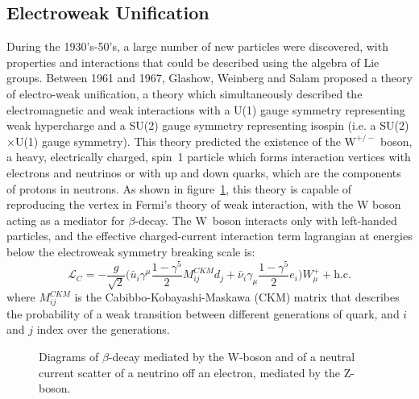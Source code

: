 \documentclass[/main.tex]{subfiles}
\begin{document}
\subsection{Electroweak Unification}
During the 1930's-50's, a large number of new particles were discovered, with properties and interactions that could be described using the algebra of Lie groups.
Between 1961 and 1967, Glashow, Weinberg and Salam proposed a theory of electro-weak unification, a theory which simultaneously described the electromagnetic and weak interactions with a U(1) gauge symmetry representing weak hypercharge and a SU(2) gauge symmetry representing isospin (i.e. a SU(2)$\times$U(1) gauge symmetry)\cite{Glashow1962, Weinberg1967, Salam1968}.
This theory predicted the existence of the $\mathrm{W}^{+/-}$ boson, a heavy, electrically charged, spin~1 particle which forms interaction vertices with electrons and neutrinos or with up and down quarks, which are the components of protons in neutrons.
As shown in figure~\ref{fig:betadecayW}, this theory is capable of reproducing the vertex in Fermi's theory of weak interaction, with the W boson acting as a mediator for $\beta$-decay.
The W~boson interacts only with left-handed particles, and the effective charged-current interaction term lagrangian at energies below the electroweak symmetry breaking scale is:
\begin{equation}
  \mathcal{L}_C=-\frac{g}{\sqrt{2}}\big(\bar u_i \gamma^\mu \frac{1-\gamma^5}{2} M^{CKM}_{ij}d_j + \bar \nu_i \gamma_\mu \frac{1-\gamma^5}{2} e_i\big)W^+_\mu + \mathrm{h.c.}  
\end{equation}
where $M^{CKM}_{ij}$ is the Cabibbo-Kobayashi-Maskawa (CKM) matrix that describes the probability of a weak transition between different generations of quark, and $i$ and $j$ index over the generations.
\begin{figure}[t]
  \centering
  \caption[$\beta$-decay diagram with W]{\label{fig:betadecayW}
    Diagrams of $\beta$-decay mediated by the W-boson and of a neutral current scatter of a neutrino off an electron, mediated by the Z-boson.
  }
\end{figure}
\end{document}
